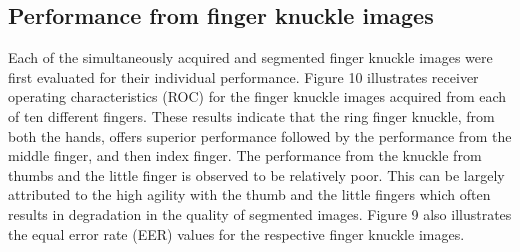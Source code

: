 \subsection{Performance from finger knuckle images}

Each of the simultaneously acquired and segmented finger knuckle images were first evaluated for their individual performance. Figure 10 illustrates receiver operating characteristics (ROC) for the finger knuckle images acquired from each of ten different fingers.  These results indicate that the ring finger knuckle, from both the hands, offers superior performance followed by the performance from the middle finger, and then index finger. The performance from the knuckle from thumbs and the little finger is observed to be relatively poor. This can be largely attributed to the high agility with the thumb and the little fingers which often results in degradation in the quality of segmented images. Figure 9 also illustrates the equal error rate (EER) values for the respective finger knuckle images. 